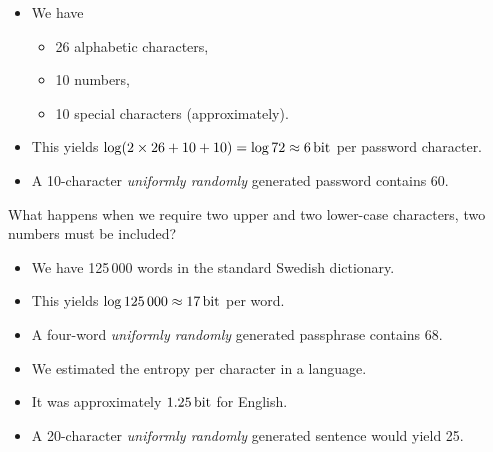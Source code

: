 \begin{frame}
  \begin{example}
    \begin{itemize}
      \item We have
        \begin{itemize}
          \item 26 alphabetic characters,
          \item 10 numbers,
          \item 10 special characters (approximately).
        \end{itemize}

      \item This yields \(\log( 2\times 26 + 10 + 10 ) = \log 72 \approx 
          \SI{6}{\bit}\) per password character.

      \item A 10-character \emph{uniformly randomly} generated password 
        contains \SI{60}{\bit}.
    \end{itemize}
  \end{example}

  \pause{}

  \begin{remark}
    What happens when we require two upper and two lower-case characters, two 
    numbers must be included?
  \end{remark}
\end{frame}

\begin{frame}
  \begin{example}
    \begin{itemize}
      \item We have 125\,000 words in the standard Swedish dictionary.
      \item This yields \(\log 125\,000\approx \SI{17}{\bit}\) per word.
      \item A four-word \emph{uniformly randomly} generated passphrase contains
        \SI{68}{\bit}.
    \end{itemize}
  \end{example}
\end{frame}

\begin{frame}
  \begin{example}
    \begin{itemize}
      \item We estimated the entropy per character in a language.
      \item It was approximately \(\SI{1.25}{\bit}\) for English.
      \item A 20-character \emph{uniformly randomly} generated sentence would 
        yield \SI{25}{\bit}.
    \end{itemize}
  \end{example}
\end{frame}

